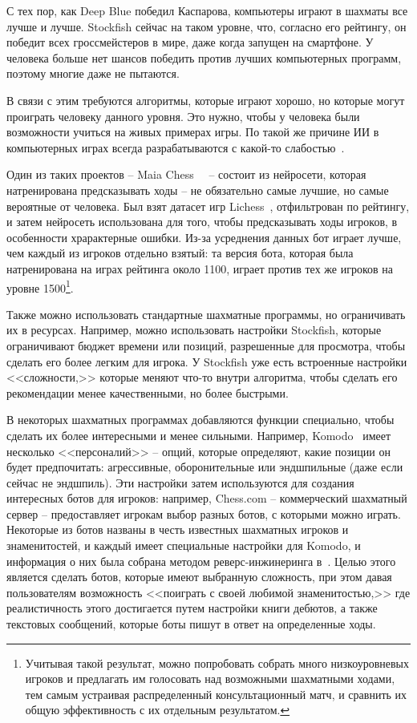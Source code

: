 \documentclass{article}
\begin{document}
С тех пор, как Deep Blue победил Каспарова,
компьютеры играют в шахматы все лучше и лучше.
Stockfish сейчас на таком уровне,
что, согласно его рейтингу,
он победит всех гроссмейстеров в мире,
даже когда запущен на смартфоне.
У человека больше нет шансов победить против лучших компьютерных программ,
поэтому многие даже не пытаются.

В связи с этим требуются алгоритмы,
которые играют хорошо, но которые могут проиграть человеку данного уровня.
Это нужно, чтобы у человека были возможности учиться на живых примерах игры.
По такой же причине ИИ в компьютерных играх всегда разрабатываются
с какой-то слабостью~\cite{gmtk-ai}.

Один из таких проектов -- Maia Chess~\cite{maia-chess-article}~\cite{maia-chess-repo} -- 
состоит из нейросети, которая натренирована предсказывать ходы --
не обязательно самые лучшие, но самые вероятные от человека.
Был взят датасет игр Lichess~\cite{lichess-dataset},
отфильтрован по рейтингу,
и затем нейросеть использована для того, чтобы предсказывать ходы игроков,
в особенности храрактерные ошибки.
Из-за усреднения данных бот играет лучше, чем каждый из игроков отдельно взятый:
та версия бота, которая была натренирована на играх рейтинга около 1100,
играет против тех же игроков на уровне 1500\footnote{
    Учитывая такой результат, можно попробовать собрать много низкоуровневых игроков
    и предлагать им голосовать над возможными шахматными ходами,
    тем самым устраивая распределенный консультационный матч,
    и сравнить их общую эффективность с их отдельным результатом.
}.

Также можно использовать стандартные шахматные программы,
но ограничивать их в ресурсах.
Например, можно использовать настройки Stockfish,
которые ограничивают бюджет времени или позиций,
разрешенные для просмотра,
чтобы сделать его более легким для игрока.
У Stockfish уже есть встроенные настройки <<сложности,>>
которые меняют что-то внутри алгоритма,
чтобы сделать его рекомендации менее качественными,
но более быстрыми.

В некоторых шахматных программах добавляются функции специально,
чтобы сделать их более интересными и менее сильными.
Например, Komodo~\cite{komodo-engine} имеет несколько <<персоналий>> --
опций, которые определяют, какие позиции он будет предпочитать: агрессивные,
оборонительные или эндшпильные (даже если сейчас не эндшпиль).
Эти настройки затем используются для создания интересных ботов для игроков:
например, Chess.com -- коммерческий шахматный сервер --
предоставляет игрокам выбор разных ботов, с которыми можно играть.
Некоторые из ботов названы в честь известных шахматных игроков и знаменитостей,
и каждый имеет специальные настройки для Komodo, и информация о них была собрана методом реверс-инжинеринга в~\cite{chesscom-bot-info}.
Целью этого является сделать ботов, которые имеют
выбранную сложность, при этом давая пользователям возможность
<<поиграть с своей любимой знаменитостью,>>
где реалистичность этого достигается путем настройки книги дебютов,
а также текстовых сообщений, которые боты пишут в ответ на определенные ходы.
\end{document}

